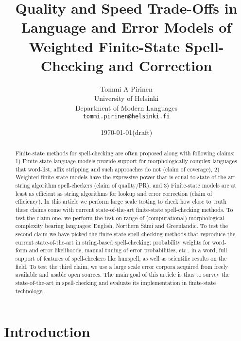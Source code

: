 \documentclass[a4paper,12pt]{article}
\title{Quality and Speed Trade-Offs in
    Language and Error Models of
    Weighted Finite-State Spell-Checking and Correction}
\author{Tommi A Pirinen\\
 [0.5cm] University of Helsinki\\ %
 Department of Modern Languages\\ %
 \texttt{tommi.pirinen@helsinki.fi}}   %
\date{\today (draft)}
\begin{document}
\ifpdf
{}
\fi

\maketitle 
\thispagestyle{empty}

\begin{abstract}
\noindent 
Finite-state methods for spell-checking are often proposed along with following
claims: 1) Finite-state language models provide support for morphologically
complex languages that word-list, affix stripping and such approaches do not
(claim of coverage), 2) Weighted finite-state models have the expressive power
that is equal to state-of-the-art string algorithm spell-checkers (claim of
quality/PR), and 3) Finite-state models are at least as efficient as string
algorithms for lookup and error correction (claim of efficiency).  In this
article we perform large scale testing to check how close to truth these claims
come with current state-of-the-art finite-state spell-checking methods. To test
the claim one, we perform the test on range of (computational) morphological
complexity bearing languages: English, Northern Sámi and Greenlandic.
To test the second claim we have picked the finite-state spell-checking methods
that reproduce the current state-of-the-art in string-based spell-checking:
probability weights for word-form and error likelihoods, manual tuning of error
probabilities, etc., in a word, full support of features of spell-checkers like
hunspell, as well as scientific results on the field. To test the third claim,
we use a large scale error corpora acquired from freely available and usable
open sources. The main goal of this article is thus to survey the
state-of-the-art in spell-checking and evaluate its implementation in
finite-state technology.
\end{abstract}


\makeatletter\let\chapter\@undefined\makeatother
\listoftodos

\section{Introduction} 
\end{document}
